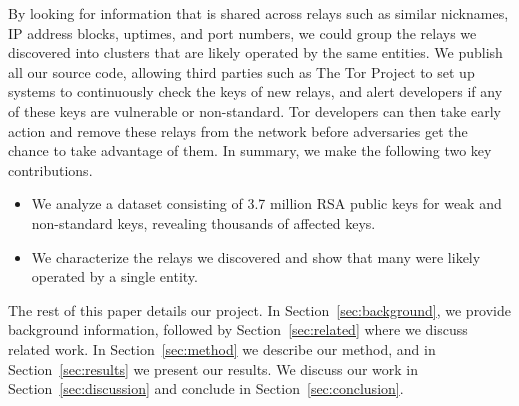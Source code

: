 By looking for information that is shared across relays such as similar
nicknames, IP address blocks, uptimes, and port numbers, we could group the
relays we discovered into clusters that are likely operated by the same
entities.  We publish all our source code, allowing third parties such as The
Tor Project to set up systems to continuously check the keys of new relays, and
alert developers if any of these keys are vulnerable or non-standard.  Tor
developers can then take early action and remove these relays from the network
before adversaries get the chance to take advantage of them.  In summary, we
make the following two key contributions.
\begin{itemize}
	\item We analyze a dataset consisting of 3.7 million RSA public keys for
		weak and non-standard keys, revealing thousands of affected keys.

	\item We characterize the relays we discovered and show that many were
		likely operated by a single entity.
\end{itemize}

The rest of this paper details our project.  In Section~\ref{sec:background}, we
provide background information, followed by Section~\ref{sec:related} where we 
discuss related work.  In Section~\ref{sec:method} we describe our method,
and in Section~\ref{sec:results} we present our results.  We discuss our work in
Section~\ref{sec:discussion} and conclude in Section~\ref{sec:conclusion}.
